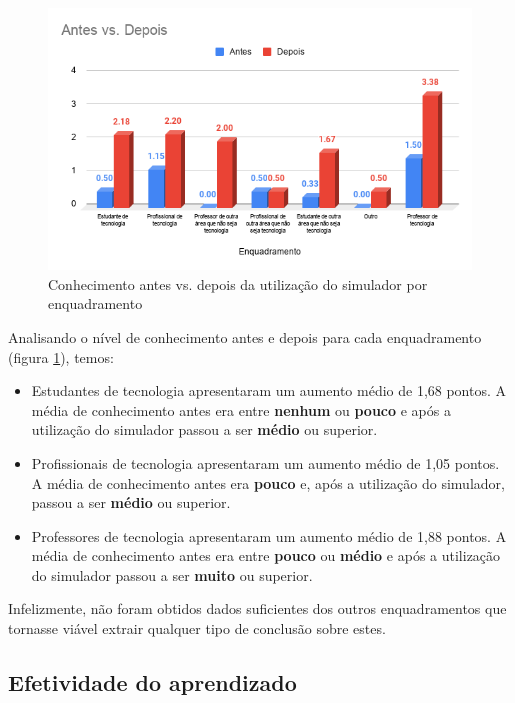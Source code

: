 \begin{figure}[H]
    \centering
    \caption{Conhecimento antes vs. depois da utilização do simulador por enquadramento}
    \label{fig:conhecimentoantesdepoisresp}
    \includegraphics[width=.9\linewidth]{Questionario/CQ2Q3.png}
\end{figure}

Analisando o nível de conhecimento antes e depois para cada enquadramento (figura \ref{fig:conhecimentoantesdepoisresp}), temos:

\begin{itemize}
    \item Estudantes de tecnologia apresentaram um aumento médio de 1,68 pontos. A média de conhecimento antes era entre \textbf{nenhum} ou \textbf{pouco} e após a utilização do simulador passou a ser \textbf{médio} ou superior.
    \item Profissionais de tecnologia apresentaram um aumento médio de 1,05 pontos. A média de conhecimento antes era \textbf{pouco} e, após a utilização do simulador, passou a ser \textbf{médio} ou superior.
    \item Professores de tecnologia apresentaram um aumento médio de 1,88 pontos. A média de conhecimento antes era entre \textbf{pouco} ou \textbf{médio} e após a utilização do simulador passou a ser \textbf{muito} ou superior.
\end{itemize}

Infelizmente, não foram obtidos dados suficientes dos outros enquadramentos que tornasse viável extrair qualquer tipo de conclusão sobre estes.

\subsection{Efetividade do aprendizado}


